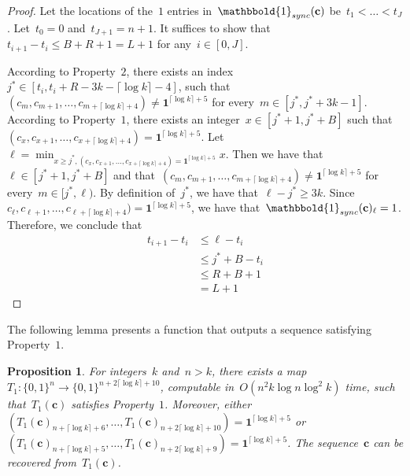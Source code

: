 \documentclass[10pt,a4paper,onecolumn]{IEEEtran}
\newtheorem{proposition}{Proposition}
\newcommand{\1}{\mathbbold{1}}
\newcommand{\boldc}{\mathbf{c}}
\begin{document}
\begin{proof}
Let 
the locations of the~$1$ entries in~$\1_{sync}(\boldc)$ be~$t_1<\ldots<t_J$. Let~$t_0=0$ and~$t_{J+1}=n+1$. It suffices to show that~$t_{i+1}-t_i\le B+R+1=L+1$ for any~$i\in [0,J]$. 

According to Property~$2$, there exists an index~$j^*\in [t_i,t_i+R-3k-\lceil \log k\rceil-4]$, such that~$(c_{m},c_{m+1},\ldots,c_{m+\lceil\log k\rceil+4})\ne \boldsymbol{1}^{\lceil\log k\rceil+5}$ for every~$m\in [j^*,j^*+3k-1]$. 
According to Property~$1$, there exists an integer~$x\in [j^*+1,j^*+B]$ such that ~$(c_{x},c_{x+1},\ldots,c_{x+\lceil\log k\rceil+4})= \boldsymbol{1}^{\lceil\log k\rceil+5}$. 
Let~$\ell=\min_{x\ge j^*,(c_{x},c_{x+1},\ldots,c_{x+\lceil\log k\rceil+4})= \boldsymbol{1}^{\lceil\log k\rceil+5}}x$. Then we have that~$\ell\in [j^*+1,j^*+B]$ and that~$(c_{m},c_{m+1},\ldots,c_{m+\lceil\log k\rceil+4})\ne \boldsymbol{1}^{\lceil\log k\rceil+5}$ for every~$m\in [j^*,\ell)$.
By definition of~$j^*$, we have that~$\ell-j^*\ge 3k$. Since~$c_{\ell},c_{\ell+1},\ldots,c_{\ell+\lceil\log k\rceil+4})= \boldsymbol{1}^{\lceil\log k\rceil+5}$, we have that~$\1_{sync}(\boldc)_{\ell}=1$. 
Therefore, we conclude that
\begin{align*}
t_{i+1}-t_i&\le \ell-t_i\\
&\le j^*+B-t_i\\
&\le R+B+1\\
&=L+1
\end{align*}
\end{proof}
The following lemma presents a function that outputs a sequence satisfying Property~$1$.
\begin{proposition}\label{lemma:frequentpattern}
For integers~$k$ and~$n>k$, there exists a map~$T_{1}:\{0,1\}^n\rightarrow \{0,1\}^{n+2\lceil \log k\rceil+10}$, computable in~$O(n^2k\log n\log^2 k)$ time, such that~$T_1(\boldc)$ satisfies Property~$1$. Moreover, either~$(T_1(\boldc)_{n+\lceil \log k\rceil+6},\ldots,T_1(\boldc)_{n+2\lceil \log k\rceil+10})=\boldsymbol{1}^{\lceil \log k\rceil+5}$ or
\newline
$(T_1(\boldc)_{n+\lceil \log k\rceil+5},\ldots,T_1(\boldc)_{n+2\lceil \log k\rceil+9})=\boldsymbol{1}^{\lceil \log k\rceil+5}$.
The sequence~$\boldc$ can be recovered from~$T_1(\boldc)$. 
\end{proposition}
\end{document}
